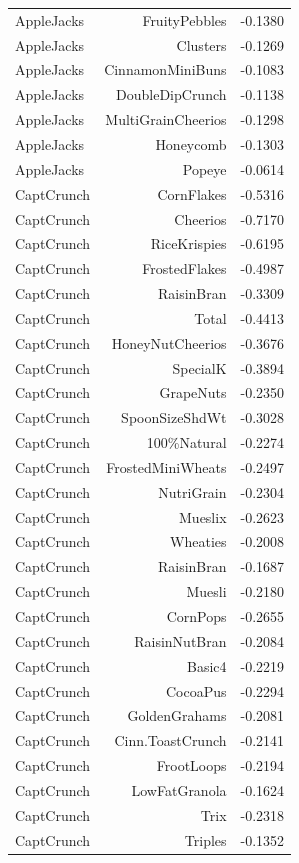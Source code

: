 \begin{longtable}{@{}lrr@{}}
AppleJacks & FruityPebbles & -0.1380 \\
AppleJacks & Clusters & -0.1269 \\
AppleJacks & CinnamonMiniBuns & -0.1083 \\
AppleJacks & DoubleDipCrunch & -0.1138 \\
AppleJacks & MultiGrainCheerios & -0.1298 \\
AppleJacks & Honeycomb & -0.1303 \\
AppleJacks & Popeye & -0.0614 \\
CaptCrunch & CornFlakes & -0.5316 \\
CaptCrunch & Cheerios & -0.7170 \\
CaptCrunch & RiceKrispies & -0.6195 \\
CaptCrunch & FrostedFlakes & -0.4987 \\
CaptCrunch & RaisinBran & -0.3309 \\
CaptCrunch & Total & -0.4413 \\
CaptCrunch & HoneyNutCheerios & -0.3676 \\
CaptCrunch & SpecialK & -0.3894 \\
CaptCrunch & GrapeNuts & -0.2350 \\
CaptCrunch & SpoonSizeShdWt & -0.3028 \\
CaptCrunch & 100\%Natural & -0.2274 \\
CaptCrunch & FrostedMiniWheats & -0.2497 \\
CaptCrunch & NutriGrain & -0.2304 \\
CaptCrunch & Mueslix & -0.2623 \\
CaptCrunch & Wheaties & -0.2008 \\
CaptCrunch & RaisinBran & -0.1687 \\
CaptCrunch & Muesli & -0.2180 \\
CaptCrunch & CornPops & -0.2655 \\
CaptCrunch & RaisinNutBran & -0.2084 \\
CaptCrunch & Basic4 & -0.2219 \\
CaptCrunch & CocoaPus & -0.2294 \\
CaptCrunch & GoldenGrahams & -0.2081 \\
CaptCrunch & Cinn.ToastCrunch & -0.2141 \\
CaptCrunch & FrootLoops & -0.2194 \\
CaptCrunch & LowFatGranola & -0.1624 \\
CaptCrunch & Trix & -0.2318 \\
CaptCrunch & Triples & -0.1352 \\

\end{longtable}
